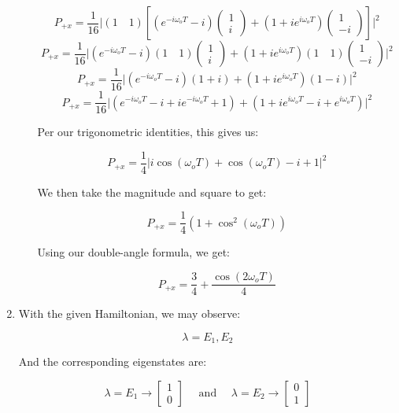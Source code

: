 \begin{enumerate}
\begin{enumerate}
        $$P_{+x}=\frac{1}{16}\Big|(1\quad1 )\left[\left(e^{-i\omega_o T}-i\right)\left( \begin{matrix}1\\i \end{matrix}\right)+\left(1+ie^{i\omega_o T}\right)\left( \begin{matrix} 1\\-i\end{matrix} \right)\right]\Big|^2$$
        $$P_{+x}=\frac{1}{16}\Big|\left(e^{-i\omega_o T}-i\right)(1\quad 1)\left( \begin{matrix}1\\i \end{matrix}\right)+\left(1+ie^{i\omega_o T}\right)(1\quad1)\left( \begin{matrix} 1\\-i\end{matrix} \right)\Big|^2$$
        $$P_{+x}=\frac{1}{16}\Big|\left(e^{-i\omega_o T}-i\right)(1+i)+\left(1+ie^{i\omega_o T}\right)(1-i)\Big|^2$$
        $$P_{+x}=\frac{1}{16}\Big|\left(e^{-i\omega_o T}-i+ie^{-i\omega_o T}+1\right)+\left(1+ie^{i\omega_o T}-i+e^{i\omega_o T}\right)\Big|^2$$

        Per our trigonometric identities, this gives us:

        $$P_{+x}=\frac{1}{4}\Big|i\cos(\omega_o T)+\cos(\omega_o T)-i+1\Big|^2$$

        We then take the magnitude and square to get:

        $$P_{+x}=\frac{1}{4}(1+\cos^2(\omega_o T))$$

        Using our double-angle formula, we get:

        $$\boxed{P_{+x}=\frac{3}{4}+\frac{\cos(2\omega_oT)}{4}}$$

    \end{enumerate}

  \item With the given Hamiltonian, we may observe:

    $$\lambda=E_1,E_2$$

    And the corresponding eigenstates are:

    $$\lambda=E_1\to\left[ \begin{matrix} 1\\0\end{matrix} \right]\quad\text{ and }\quad \lambda=E_2\to\left[ \begin{matrix} 0\\1\end{matrix} \right]$$


\end{enumerate}
